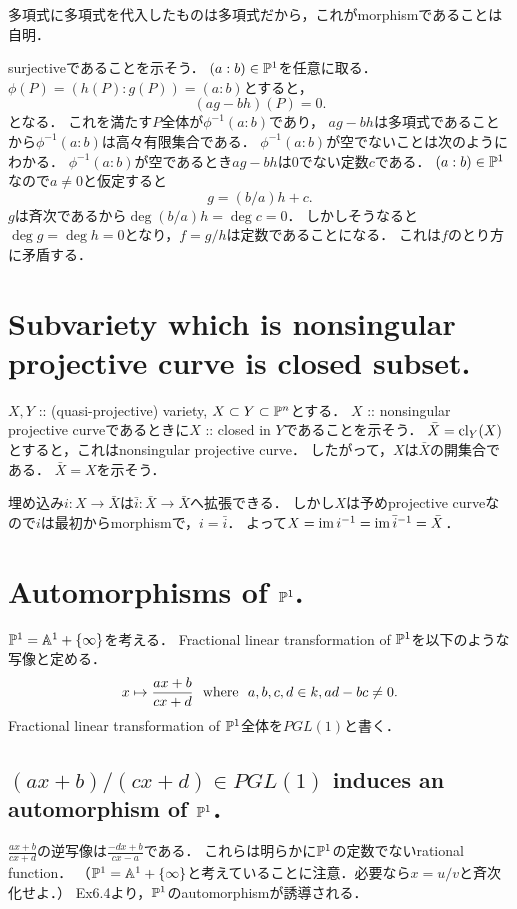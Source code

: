 \documentclass[a4paper]{jsarticle}
\begin{document}
    多項式に多項式を代入したものは多項式だから，これがmorphismであることは自明．

    surjectiveであることを示そう．
    $(a:b) \in \mathbb{P}^1$を任意に取る．
    $\phi(P)=(h(P):g(P))=(a:b)$とすると，
    \[ (ag-bh)(P)=0. \]
    となる．
    これを満たす$P$全体が$\phi^{-1}(a:b)$であり，
    $ag-bh$は多項式であることから$\phi^{-1}(a:b)$は高々有限集合である．
    $\phi^{-1}(a:b)$が空でないことは次のようにわかる．
    $\phi^{-1}(a:b)$が空であるとき$ag-bh$は0でない定数$c$である．
    $(a:b) \in \mathbb{P}^1$なので$a \neq 0$と仮定すると\[ g=(b/a)h+c. \]
    $g$は斉次であるから$\deg (b/a)h=\deg c=0$．
    しかしそうなると$\deg g=\deg h=0$となり，$f=g/h$は定数であることになる．
    これは$f$のとり方に矛盾する．

\section{Subvariety which is nonsingular projective curve is closed subset.} %
    $X,Y$ :: (quasi-projective) variety, $X \subset Y \subset \mathbb{P}^n$とする．
    $X$ :: nonsingular projective curveであるときに$X$ :: closed in $Y$であることを示そう．
    $\bar{X}=\operatorname{cl}_{Y}(X)$とすると，これはnonsingular projective curve．
    したがって，$X$は$\bar{X}$の開集合である．
    $\bar{X}=X$を示そう．

    埋め込み$i: X \to \bar{X}$は$\bar{i}: \bar{X} \to \bar{X}$へ拡張できる．
    しかし$X$は予めprojective curveなので$i$は最初からmorphismで，$i=\bar{i}$．
    よって$X=\operatorname{im} i^{-1}=\operatorname{im} \bar{i}^{-1}=\bar{X}$．

\section{Automorphisms of $\mathbb{P}^1$.} %
    $\mathbb{P}^1=\mathbb{A}^1+\{\infty\}$を考える．
    Fractional linear transformation of $\mathbb{P}^1$を以下のような写像と定める．
    \[ x \mapsto \frac{ax+b}{cx+d} \text{~~where~~} a,b,c,d \in k, ad-bc \neq 0. \]
    Fractional linear transformation of $\mathbb{P}^1$全体を$PGL(1)$と書く．

    \subsection{$(ax+b)/(cx+d) \in PGL(1)$ induces an automorphism of $\mathbb{P}^1$．}
    $\frac{ax+b}{cx+d}$の逆写像は$\frac{-dx+b}{cx-a}$である．
    これらは明らかに$\mathbb{P}^1$の定数でないrational function．
    （$\mathbb{P}^1=\mathbb{A}^1+\{\infty\}$と考えていることに注意．必要なら$x=u/v$と斉次化せよ．）
    Ex6.4より，$\mathbb{P}^1$のautomorphismが誘導される．
\end{document}
